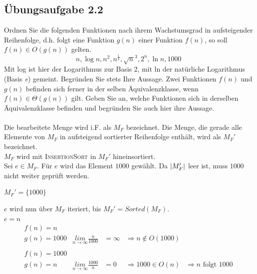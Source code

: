 \documentclass{article}
\begin{document}
\subsection{Übungsaufgabe 2.2}
\begin{flushright}
\begin{Large}
[~~~~\string| ~~4~]
\end{Large}
\end{flushright}
Ordnen Sie die folgenden Funktionen nach ihrem Wachstumsgrad in aufsteigender Reihenfolge, d.h. folgt eine Funktion $g(n)$ einer Funktion $f(n)$, so soll $f(n) \in O(g(n))$ gelten.
\[
	n, \operatorname{log} n, n^2, n^{\frac{1}{2}}, \sqrt{n}^3, 2^n, \operatorname{ln} n, 1000
\]
Mit log ist hier der Logarithmus zur Basis 2, mit ln der natürliche Logarithmus (Basis \textit{e}) gemeint.
Begründen Sie stets Ihre Aussage.
Zwei Funktionen $f(n)$ und $g(n)$ befinden sich ferner in der selben Äquivalenzklasse, wenn $f(n) \in \Theta (g(n))$ gilt.
Geben Sie an, welche Funktionen sich in derselben Äquivalenzklasse befinden und begründen Sie auch hier ihre Aussage.\\
\vspace{1cm}\\
Die bearbeitete Menge wird i.F. als $M_F$ bezeichnet.
Die Menge, die gerade alle Elemente von $M_F$ in aufsteigend sortierter Reihenfolge enthält, wird als $M_F'$ bezeichnet.\\
$M_F$ wird mit \textsc{InsertionSort} in $M_F'$ hineinsortiert.\\ \vspace{0.5cm}
Sei $e \in M_F$.
Für $e$ wird das Element $1000$ gewählt.
Da $\string|M_F'\string|$ leer ist, muss $1000$ nicht weiter geprüft werden.
\begin{flushright}
	$M_F' = \{1000\}$
\end{flushright}
$e$ wird nun über $M_F$ iteriert, bis $M_F' = Sorted(M_F)$. \vspace{0.5cm}\\
$e = n$
\begin{equation*}
	\begin{array}{lllll}
		f(n) = n\\
		g(n) = 1000	&	\underset{n\rightarrow\infty}{lim}	\frac{n}{1000}	&=	\infty	&\Rightarrow n \not \in O(1000)
		\\\\
		f(n) = 1000\\
		g(n) = n & \underset{n\rightarrow\infty}{lim} \frac{1000}{n} &= 0 &\Rightarrow 1000 \in O(n) &\Rightarrow  n \text{ folgt } 1000
	\end{array}
\end{equation*}
\end{document}
